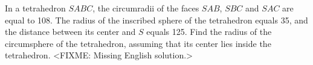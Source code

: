 \problem
In a tetrahedron $SABC$, the circumradii of the faces $SAB$, $SBC$ and $SAC$
are equal to 108.
The radius of the inscribed sphere of the tetrahedron equals 35, and the
distance between its center and $S$ equals 125.
Find the radius of the circumsphere of the tetrahedron, assuming that its
center lies inside the tetrahedron.
\solution
<FIXME: Missing English solution.>
\endproblem

